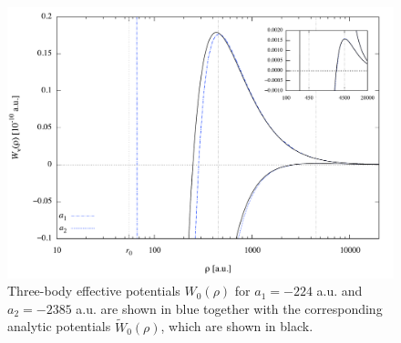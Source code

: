 \begin{figure}
	\includegraphics[width=\linewidth]{barrier_analytic.pdf}
	\caption{Three-body effective potentials $W_0(\rho)$ for $a_1=-224$ a.u. and $a_2=-2385$ a.u. are shown in blue together with the corresponding analytic potentials $\widetilde{W}_0(\rho)$, which are shown in black.}
	\label{fig:barrier_analytic}
\end{figure}